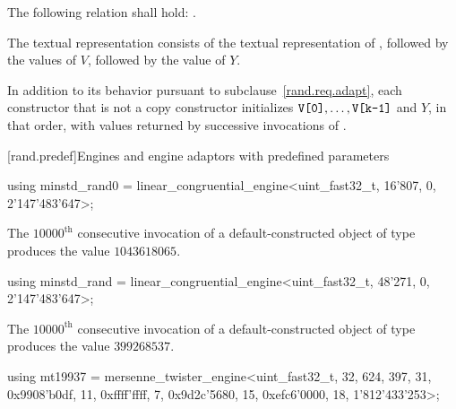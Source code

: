 \pnum
The following relation shall hold:
  .

\pnum
The textual representation
consists of
 the textual representation of ,
followed by
 the  values of $V$,
followed by
 the value of $Y$.

\pnum
In addition to its behavior
pursuant to subclause~\ref{rand.req.adapt},
each constructor%
that is not a copy constructor
initializes $\texttt{\protect V[0]}, \dotsc, \texttt{\protect V[k-1]}$ and $Y$,
in that order,
with values returned by successive invocations of .%




[rand.predef]{Engines and engine adaptors with predefined parameters}%
%
%

%
\begin{itemdecl}
using minstd_rand0 =
      linear_congruential_engine<uint_fast32_t, 16'807, 0, 2'147'483'647>;
\end{itemdecl}

\begin{itemdescr}
\pnum
\required
 The $10000^\text{th}$ consecutive invocation
 of a default-constructed object
 of type 
 produces the value $1043618065$.
\end{itemdescr}

%
\begin{itemdecl}
using minstd_rand =
      linear_congruential_engine<uint_fast32_t, 48'271, 0, 2'147'483'647>;
\end{itemdecl}

\begin{itemdescr}
\pnum
\required
 The $10000^\text{th}$ consecutive invocation
 of a default-constructed object
 of type 
 produces the value $399268537$.
\end{itemdescr}

%
\begin{itemdecl}
using mt19937 =
      mersenne_twister_engine<uint_fast32_t, 32, 624, 397, 31,
       0x9908'b0df, 11, 0xffff'ffff, 7, 0x9d2c'5680, 15, 0xefc6'0000, 18, 1'812'433'253>;
\end{itemdecl}

